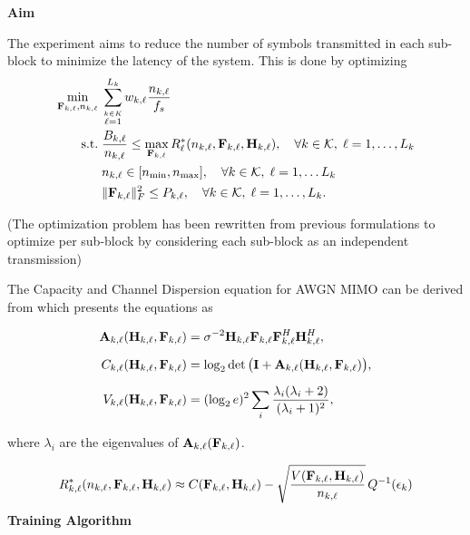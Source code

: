 \documentclass[a4paper, 12pt, onecolumn, journal, twoside, draftclsnofoot]{IEEEtran}
\begin{document}
\textbf{Aim}

The experiment aims to reduce the number of symbols transmitted in each sub-block
to minimize the latency of the system. This is done by optimizing
\begin{equation*}
	\begin{split}
		\min_{{\bf F}_{k,\ell}, n_{k,\ell}} \;& \sum_{\stackrel {k \in K} {\ell =1}}^{L_k} w_{k,\ell} \frac{n_{k,\ell}}{f_s} \\
		\text{s.t.}\;& \frac{B_{k,\ell}}{n_{k,\ell}} \leq \max_{{\bf F}_{k, \ell}} R^*_\ell(n_{k,\ell}, {\bf F}_{k, \ell},  {\bf H}_{k,\ell}), \quad \forall k \in { \mathcal{K} }, \; \ell = 1, \ldots, L_k \\ 
		& n_{k,\ell} \in [n_{\text{min}}, n_{\text{max}}], \quad \forall k \in { \mathcal{K} }, \; \ell = 1, \ldots L_k \\
		& \|{\bf F}_{k,\ell}\|_F^2 \leq P_{k,\ell}, \quad \forall k \in { \mathcal{K} }, \; \ell = 1, \ldots, L_k. 
	\end{split}
\end{equation*}


(The optimization problem has been rewritten from previous formulations to optimize per sub-block by considering each sub-block as an independent transmission)

The Capacity and Channel Dispersion equation for AWGN MIMO can be derived from \cite{yuri2010} which presents the equations as

\begin{equation}
\begin{aligned}
\mathbf{A}_{k,\ell}({\bf H}_{k,\ell},{\bf F}_{k,\ell})
&=
\sigma^{-2}
\mathbf{H}_{k,\ell}
{\bf F}_{k,\ell}
{\bf F}_{k,\ell}^H
\mathbf{H}_{k,\ell}^H, \\[2mm]
C_{k,\ell}({\bf H}_{k,\ell}, {\bf F}_{k,\ell})
&=
\log_2 \det \big(
\mathbf{I}
+
\mathbf{A}_{k,\ell}({\bf H}_{k,\ell},{\bf F}_{k,\ell})
\big), \\[2mm]
V_{k,\ell}({\bf H}_{k,\ell}, {\bf F}_{k,\ell})
&=
(\log_2 e)^2
\sum_i
\frac{\lambda_i (\lambda_i + 2)}{(\lambda_i + 1)^2},
\end{aligned}
\label{eq:capacity_dispersion}
\end{equation}

where $\lambda_i$ are the eigenvalues of $\mathbf{A}_{k,\ell}({\bf F}_{k,\ell})$.

\begin{equation*}
	R^*_{k,\ell}(n_{k,\ell}, {\bf F}_{k,\ell}, {\bf H}_{k,\ell}) \approx C({\bf F}_{k,\ell}, {\bf H}_{k,\ell}) - \sqrt{\frac{V({\bf F}_{k,\ell}, {\bf H}_{k,\ell})}{n_{k,\ell}}} \, Q^{-1}(\epsilon_{k})
\end{equation*}
\textbf{Training Algorithm}
\end{document}
